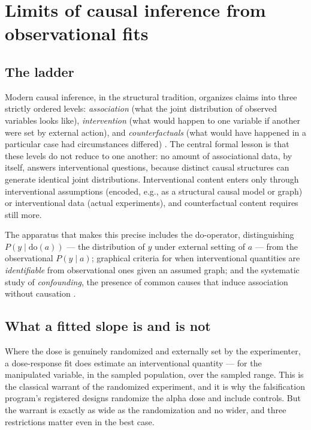 \section{Limits of causal inference from observational fits}\label{ch02:causal}

\subsection{The ladder}\label{ch02:causal:ladder}

Modern causal inference, in the structural tradition, organizes claims into three strictly ordered levels: \emph{association} (what the joint distribution of observed variables looks like), \emph{intervention} (what would happen to one variable if another were set by external action), and \emph{counterfactuals} (what would have happened in a particular case had circumstances differed) \cite{pearl}. The central formal lesson is that these levels do not reduce to one another: no amount of associational data, by itself, answers interventional questions, because distinct causal structures can generate identical joint distributions. Interventional content enters only through interventional assumptions (encoded, e.g., as a structural causal model or graph) or interventional data (actual experiments), and counterfactual content requires still more.

The apparatus that makes this precise includes the do-operator, distinguishing $P(y \mid \mathrm{do}(a))$ --- the distribution of $y$ under external setting of $a$ --- from the observational $P(y \mid a)$; graphical criteria for when interventional quantities are \emph{identifiable} from observational ones given an assumed graph; and the systematic study of \emph{confounding}, the presence of common causes that induce association without causation \cite{pearl}.

\subsection{What a fitted slope is and is not}\label{ch02:causal:slope}

Where the dose is genuinely randomized and externally set by the experimenter, a dose-response fit does estimate an interventional quantity --- for the manipulated variable, in the sampled population, over the sampled range. This is the classical warrant of the randomized experiment, and it is why the falsification program's registered designs randomize the alpha dose and include controls. But the warrant is exactly as wide as the randomization and no wider, and three restrictions matter even in the best case.

